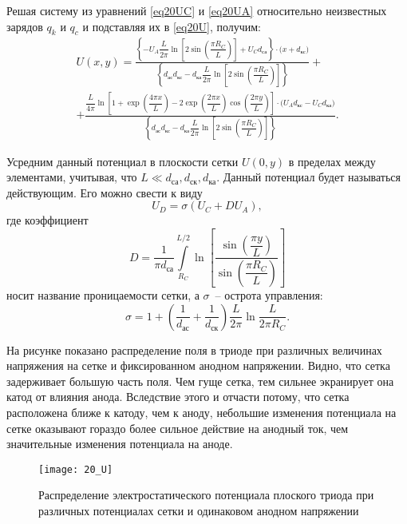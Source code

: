 Решая систему из уравнений \eqref{eq20UC} и \eqref{eq20UA} относительно неизвестных
зарядов \( q_k \) и \( q_c \) и подставляя их в \eqref{eq20U}, получим:
\begin{gather*}
  U(x, y) = \frac{\left\{ -U_A \dfrac{L}{2\pi} \ln\left[ 2\sin\left(
    \dfrac{\pi R_C}{L} \right) \right] + U_C d_\text{са} \right\} \cdot
    \Big( x + d_\text{кс} \Big)}{\left\{ d_\text{ас} d_\text{кс} - d_\text{ка}
    \dfrac{L}{2\pi} \ln\left[ 2\sin\left( \dfrac{\pi R_C}{L}
    \right) \right] \right\}} + \\
  + \frac{\dfrac{L}{4\pi} \ln\left[ 1 + \exp\left( \dfrac{4\pi x}{L} \right) -
    2\exp\left( \dfrac{2\pi x}{L} \right) \cos\left( \dfrac{2\pi y}{L} \right)
    \right] \cdot \Big(U_A d_\text{кс} - U_C d_\text{ка} \Big)}{\left\{
    d_\text{ас} d_\text{кс} - d_\text{ка} \dfrac{L}{2\pi} \ln\left[
    2\sin\left( \dfrac{\pi R_C}{L} \right) \right] \right\}}.
\end{gather*}

Усредним данный потенциал в плоскости сетки \( U(0, y) \) в пределах между
элементами, учитывая, что \( L \ll d_\text{са}, d_\text{ск}, d_\text{ка} \).
Данный потенциал будет называться действующим. Его можно свести к виду
\begin{equation}
  U_D = \sigma (U_C + D U_A),
  \label{eq20UD}
\end{equation}
где коэффициент
\[
  D = \frac{1}{\pi d_\text{са}} \int\limits_{R_C}^{L / 2} \ln\left[
    \frac{\sin\left( \dfrac{\pi y}{L} \right)}{\sin\left( \dfrac{\pi R_C}{L}
    \right)} \right]
\]
носит название проницаемости сетки, а \( \sigma \)~-- острота управления:
\[
  \sigma = 1 + \left( \frac{1}{d_\text{ас}} + \frac{1}{d_\text{ск}} \right)
    \frac{L}{2\pi} \ln\frac{L}{2\pi R_C}.
\]

На рисунке  показано распределение поля в триоде при различных
величинах напряжения на сетке и фиксированном анодном напряжении. Видно, что
сетка задерживает большую часть поля. Чем гуще сетка, тем сильнее экранирует
она катод от влияния анода. Вследствие этого и отчасти потому, что сетка
расположена ближе к катоду, чем к аноду, небольшие изменения потенциала на
сетке оказывают гораздо более сильное действие на анодный ток, чем значительные
изменения потенциала на аноде.

\begin{figure}[hb!]
  \center
  \texttt{[image: 20\_U]}
  \caption{Распределение электростатического потенциала плоского триода при
  различных потенциалах сетки и одинаковом анодном напряжении}
  \label{pic20U}
\end{figure}

